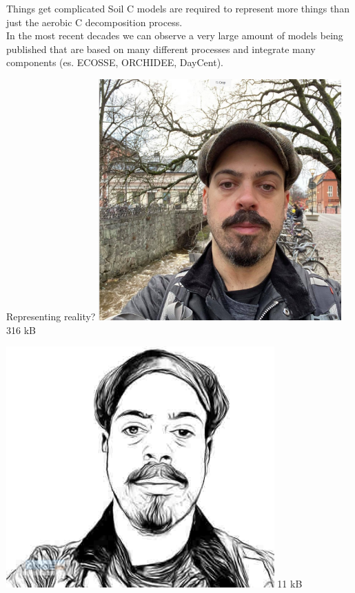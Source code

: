 \documentclass[
  ignorenonframetext,
]{beamer}
\begin{document}
\begin{frame}{Things get complicated}
\protect\hypertarget{things-get-complicated}{}
Soil C models are required to represent more things than just the
aerobic C decomposition process.\\
In the most recent decades we can observe a very large amount of models
being published that are based on many different processes and integrate
many components (es. ECOSSE, ORCHIDEE, DayCent).
\end{frame}

\begin{frame}{Representing reality?}
\protect\hypertarget{representing-reality}{}
\includegraphics[width=\textwidth,height=3.64583in]{me.jpg} 316 kB

\includegraphics[width=\textwidth,height=3.64583in]{me_model.jpg} 11 kB
\end{frame}
\end{document}
